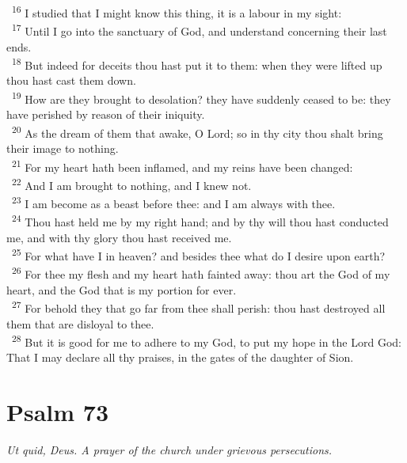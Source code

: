 \documentclass[a5paper,12pt]{article}
\begin{document}
\begin{multicols*}{2}
~\textsuperscript{16} I studied that I might know this thing, it is a labour in my sight:\\
~\textsuperscript{17} Until I go into the sanctuary of God, and understand concerning their last ends.\\
~\textsuperscript{18} But indeed for deceits thou hast put it to them: when they were lifted up thou hast cast them down.\\
~\textsuperscript{19} How are they brought to desolation? they have suddenly ceased to be: they have perished by reason of their iniquity.\\
~\textsuperscript{20} As the dream of them that awake, O Lord; so in thy city thou shalt bring their image to nothing.\\
~\textsuperscript{21} For my heart hath been inflamed, and my reins have been changed:\\
~\textsuperscript{22} And I am brought to nothing, and I knew not.\\
~\textsuperscript{23} I am become as a beast before thee: and I am always with thee.\\
~\textsuperscript{24} Thou hast held me by my right hand; and by thy will thou hast conducted me, and with thy glory thou hast received me.\\
~\textsuperscript{25} For what have I in heaven? and besides thee what do I desire upon earth?\\
~\textsuperscript{26} For thee my flesh and my heart hath fainted away: thou art the God of my heart, and the God that is my portion for ever.\\
~\textsuperscript{27} For behold they that go far from thee shall perish: thou hast destroyed all them that are disloyal to thee.\\
~\textsuperscript{28} But it is good for me to adhere to my God, to put my hope in the Lord God: That I may declare all thy praises, in the gates of the daughter of Sion.\\

\section{Psalm 73}
\label{sec:org7fbb77c}
\emph{Ut quid, Deus. A prayer of the church under grievous persecutions.}\\


\end{multicols*}
\end{document}
